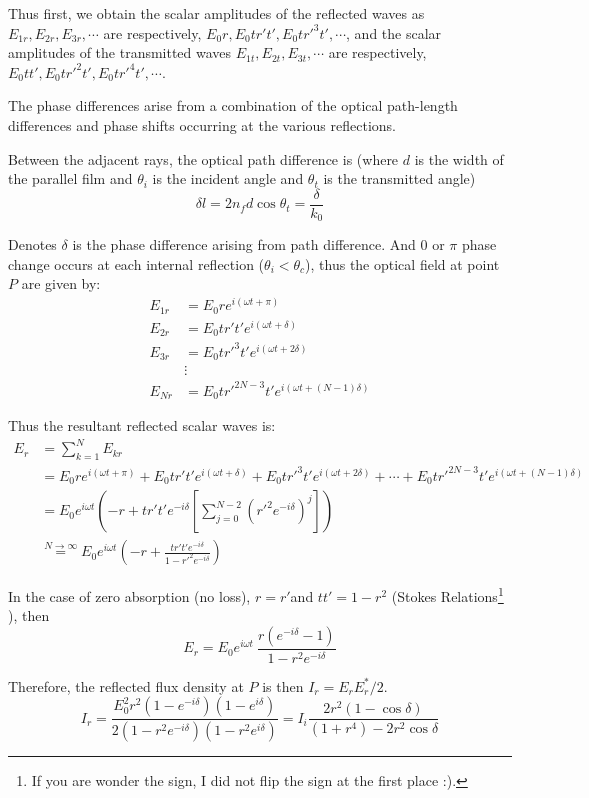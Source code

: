 \documentclass[openany]{book}
\begin{document}
Thus first, we obtain the scalar amplitudes of the reflected waves as $E_{1r},E_{2r},E_{3r},\cdots $ are respectively, $E_0r,E_0tr't',E_0tr'^3t',\cdots $, and the scalar amplitudes of the transmitted waves $E_{1t},E_{2t},E_{3t},\cdots $ are respectively, $E_0tt',E_0tr'^2t',E_0tr'^4t',\cdots$.

The phase differences arise from a combination of the optical path-length differences and phase shifts occurring at the various reflections. 

Between the adjacent rays, the optical path difference is (where $d$ is the width of the parallel film and $\theta _i$ is the incident angle and $\theta _t$ is the transmitted angle)
\[\delta l=2n_fd\cos \theta _t=\frac{\delta }{k_0}\]

Denotes $\delta $ is the phase difference arising from path difference. And $0$ or $\pi $ phase change occurs at each internal reflection ($\theta _i<\theta _c$), thus the optical field at point $P$ are given by:
\begin{align*}
E_{1r}&=E_0re^{i(\omega t+\pi)}\\
E_{2r}&=E_0tr't'e^{i(\omega t+\delta)}\\
E_{3r}&=E_0tr'^3t'e^{i(\omega t+2\delta)}\\
&\vdots\\
E_{Nr}&=E_0tr'^{2N-3}t'e^{i(\omega t+(N-1)\delta)}
\end{align*}

Thus the resultant reflected scalar waves is:
\begin{align*}
E_r&=\sum _{k=1}^{N}E_{kr}\\
&=E_0re^{i(\omega t+\pi)}+E_0tr't'e^{i(\omega t+\delta)}+E_0tr'^3t'e^{i(\omega t+2\delta)}+\cdots +E_0tr'^{2N-3}t'e^{i(\omega t+(N-1)\delta)}\\
&=E_0e^{i\omega t}\left(-r+tr't'e^{-i\delta }\left[\sum _{j=0}^{N-2}\left(r'^2e^{-i\delta}\right)^j\right]\right)\\
&\overset{N\to \infty}{=} E_0e^{i\omega t}\left(-r+\frac{tr't'e^{-i\delta }}{1-r'^2e^{-i\delta }}\right)
\end{align*}

In the case of zero absorption (no loss), $r=r'$and $tt'=1-r^2$ (Stokes Relations\footnote{If you are wonder the sign, I did not flip the sign at the first place :).} ), then
\[E_r=E_0e^{i\omega t}\ \frac{r(e^{-i\delta}-1)}{1-r^2e^{-i\delta}}\]

Therefore, the reflected flux density at $P$ is then $I_r=E_rE_r^*/2$. 
\[I_r=\frac{E_0^2r^2(1-e^{-i\delta })(1-e^{i\delta })}{2(1-r^2e^{-i\delta })(1-r^2e^{i\delta })}=I_i\frac{2r^2(1-\cos \delta)}{(1+r^4)-2r^2\cos \delta}\]
\end{document}
